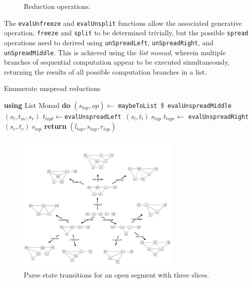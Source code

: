 \documentclass[12pt,a4paper,twoside,openany]{report} \usepackage[pdfborder={0 0 0}]{hyperref}    %
\theoremstyle{definition} \newtheorem{definition}{Definition}[section]
\begin{document}
\begin{figure}[ht]
  \captionsetup{width=.9\linewidth} \caption{Reduction operations.} \label{fig:evalOps} \end{figure}

  The \texttt{evalUnfreeze} and \texttt{evalUnsplit} functions allow the associated generative operation,
  \texttt{freeze} and \texttt{split} to be determined trivially, but the possible \texttt{spread} operations need to
  derived using \texttt{unSpreadLeft}, \texttt{unSpreadRight}, and \texttt{unSpreadMiddle}. This is achieved using the
  \textit{list monad}, wherein multiple branches of sequential computation appear to be executed simultaneously,
  returning the results of all possible computation branches in a list.

  \begin{algorithm}[ht] 
    \caption{Enumerate unspread reductions} 
    \label{code:heuristic0}
    \begin{algorithmic}[1] 
      \State \textbf{using} List Monad
      \textbf{do} 
        \State $(s_{top}, op) \gets$ \texttt{maybeToList}~\$~\texttt{evalUnspreadMiddle} $(s_l, t_m, s_r)$
        \State $t_{topl} \gets $\texttt{evalUnspreadLeft}~$(s_l, t_l)~s_{top}$ 
        \State $t_{topr} \gets$ \texttt{evalUnspreadRight}~$(s_r, t_r)~s_{top}$ 
        \State \textbf{return} $(l_{top}, s_{top}, r_{top}) $
      \EndFunction
    \end{algorithmic} 
  \end{algorithm}

    \begin{figure}[ht] 
      \centering 
      \includegraphics[width=0.7\textwidth]{impl/parseTreeOpen.png} 
      \caption{Parse state transitions for an open segment with three slices.} 
      \label{fig:statetrans} 
    \end{figure}
\end{document}
